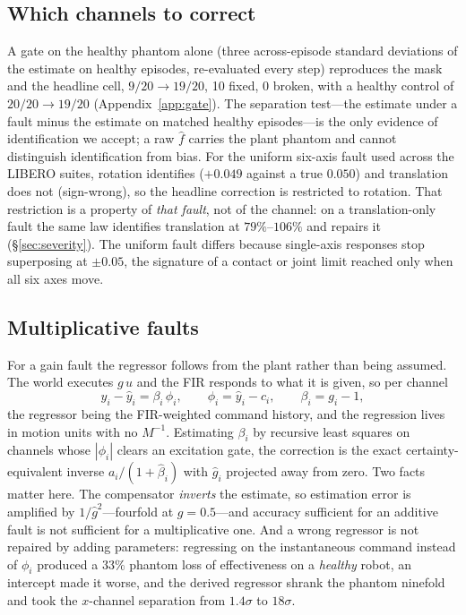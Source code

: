 \documentclass{article}
\newcommand{\fhat}{\hat{f}}
\begin{document}
\subsection{Which channels to correct}
\label{sec:channels}

A gate on the healthy phantom alone (three across-episode standard deviations of the
estimate on healthy episodes, re-evaluated every step) reproduces the mask and the headline
cell, $9/20\to19/20$, 10 fixed, 0 broken, with a healthy control of $20/20\to19/20$
(Appendix~\ref{app:gate}). The separation test---the estimate under a fault minus the estimate on matched healthy
episodes---is the only evidence of identification we accept; a raw $\fhat$ carries the plant
phantom and cannot distinguish identification from bias. For the uniform six-axis fault
used across the LIBERO suites, rotation identifies ($+0.049$ against a true $0.050$) and
translation does not (sign-wrong), so the headline correction is restricted to rotation.
That restriction is a property of \emph{that fault}, not of the channel: on a translation-only
fault the same law identifies translation at $79\%$--$106\%$ and repairs it
(\S\ref{sec:severity}). The uniform fault differs because single-axis responses stop superposing at
$\pm0.05$, the signature of a contact or joint limit reached only when all six axes move.

\subsection{Multiplicative faults}
\label{sec:gain}

For a gain fault the regressor follows from the plant rather than being assumed. The world
executes $g\,u$ and the FIR responds to what it is given, so per channel
\begin{equation}
y_i - \hat y_i = \beta_i\,\phi_i,\qquad \phi_i = \hat y_i - c_i,\qquad \beta_i = g_i - 1,
\end{equation}
the regressor being the FIR-weighted command history, and the regression lives in motion
units with no $M^{-1}$. Estimating $\beta_i$ by recursive least squares on channels whose
$|\phi_i|$ clears an excitation gate, the correction is the exact certainty-equivalent
inverse $a_i/(1+\hat\beta_i)$ with $\hat g_i$ projected away from zero. Two facts matter
here. The compensator \emph{inverts} the estimate, so estimation error is amplified by
$1/\hat g^2$---fourfold at $g=0.5$---and accuracy sufficient for an additive fault is not
sufficient for a multiplicative one. And a wrong regressor is not repaired by adding
parameters: regressing on the instantaneous command instead of $\phi_i$ produced a $33\%$
phantom loss of effectiveness on a \emph{healthy} robot, an intercept made it worse, and the
derived regressor shrank the phantom ninefold and took the $x$-channel separation from
$1.4\sigma$ to $18\sigma$.
\end{document}
